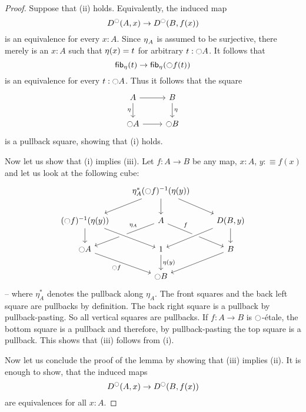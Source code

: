 \documentclass[9pt,twosided]{amsart}
\begin{document}
\begin{proof}
Suppose that (ii) holds. Equivalently, the induced map
\begin{equation*}
D^{\ocircle}(A,x)\to D^{\ocircle}(B,f(x))
\end{equation*}
is an equivalence for every $x:A$. Since ${\eta_{}}_A$ is assumed to be surjective, there merely is an $x:A$ such that ${\eta_{}}(x)=t$ for arbitrary $t:{\ocircle} A$.
It follows that
\begin{equation*}
\fib{\modalunit}{t}\to \fib{\modalunit}{\modal f(t)}
\end{equation*}
is an equivalence for every $t:{\ocircle} A$. Thus it follows that the square
\begin{equation*}
\begin{tikzcd}
A \arrow[d,swap,"\modalunit"] \arrow[r] & B \arrow[d,"\modalunit"] \\
\modal A \arrow[r] & \modal B
\end{tikzcd}
\end{equation*}
is a pullback square, showing that (i) holds.

Now let us show that (i) implies (iii).
Let $f:A\to B$ be any map, $x:A$, $y:\equiv f(x)$ and let us look at the following cube: 
\begin{equation*}
  \begin{tikzcd}
    &[-1ex] \eta_A^\ast(\modal f)^{-1}(\eta(y))\arrow[dr]\arrow[dl]\arrow[d] &                         \\
(\modal f)^{-1}(\eta(y))\arrow[d] & A\arrow[dr, "f" near start]\arrow[dl, "\eta_A" near start, swap]     & D(B,y)\arrow[d]\arrow[dl, crossing over]   \\
 \modal A\arrow[dr, "\modal f",swap]  & 1\arrow[d ,"\eta(y)"]\arrow[from=ul, crossing over] & B\arrow[dl] \\
          & \modal B &
  \end{tikzcd}
\end{equation*}
-- where $\eta_A^\ast$ denotes the pullback along $\eta_A$.
The front squares and the back left square are pullbacks by definition. The back right square is a pullback by pullback-pasting. So all vertical squares are pullbacks.
If $f:A\to B$ is ${\ocircle}$-étale, the bottom square is a pullback and therefore, by pullback-pasting the top square is a pullback. This shows that (iii) follows from (i).

Now let us conclude the proof of the lemma by showing that (iii) implies (ii).
It is enough to show, that the induced maps
\[ D^{\ocircle}(A,x)\to D^{\ocircle}(B,f(x)) \]
are equivalences for all $x:A$.


\end{proof}
\end{document}
